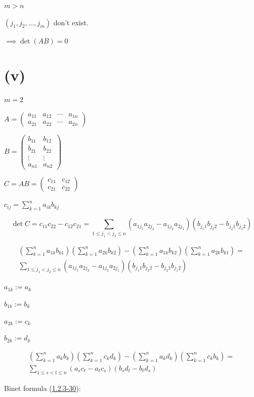 \documentclass{article}
\begin{document}
\( m > n \)

\( (j_{1},j_{2},\ldots,j_{m}) \) don't exist.

\( \implies \det(AB) = 0 \)

\section*{(v)}

\( m = 2 \)

\( A = \left(\begin{matrix} a_{11} & a_{12} & \cdots & a_{1n} \\ a_{21} & a_{22} & \cdots & a_{2n} \end{matrix}\right) \)

\( B = \left(\begin{matrix} b_{11} & b_{12} \\ b_{21} & b_{22} \\ \vdots & \vdots \\ a_{n1} & a_{n2} \end{matrix}\right) \)

\( C = AB = \left(\begin{matrix}c_{11} & c_{12} \\ c_{21} & c_{22}\end{matrix}\right) \)

\( c_{ij} = \sum_{k=1}^{n} a_{ik} b_{kj} \)

\[ \det C = c_{11}c_{22} - c_{12}c_{21} = \sum_{1\leq j_{1} < j_{2} \leq n} (a_{1j_{1}}a_{2j_{2}}-a_{1j_{2}}a_{2j_{1}})(b_{j_{1}1}b_{j_{2}2}-b_{j_{2}1}b_{j_{1}2}) \]

\begin{multline*}
(\sum_{k=1}^{n} a_{1k} b_{k1})(\sum_{k=1}^{n} a_{2k} b_{k2}) - (\sum_{k=1}^{n} a_{1k} b_{k2})(\sum_{k=1}^{n} a_{2k} b_{k1}) = \\
\sum_{1\leq j_{1} < j_{2} \leq n} (a_{1j_{1}}a_{2j_{2}}-a_{1j_{2}}a_{2j_{1}})(b_{j_{1}1}b_{j_{2}2}-b_{j_{2}1}b_{j_{1}2})
\end{multline*}

\( a_{1k} := a_{k} \)

\( b_{1k} := b_{k} \)

\( a_{2k} := c_{k} \)

\( b_{2k} := d_{k} \)

\begin{multline*}
(\sum_{k=1}^{n} a_{k} b_{k})(\sum_{k=1}^{n} c_{k} d_{k}) - (\sum_{k=1}^{n} a_{k} d_{k})(\sum_{k=1}^{n} c_{k} b_{k}) = \\
\sum_{1\leq s < t \leq n} (a_{s}c_{t}-a_{t}c_{s})(b_{s}d_{t}-b_{t}d_{s})
\end{multline*}

Binet formula (\href{./1.2.3-30.pdf}{1.2.3\mbox{-}30}):
\end{document}
